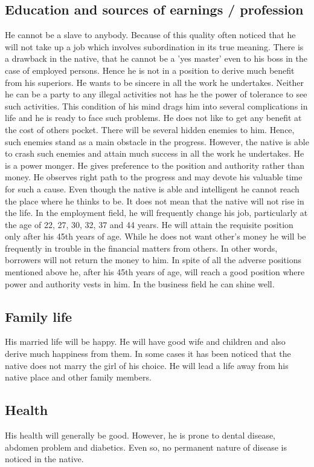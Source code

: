\documentclass[12pt, right open]{memoir}
\begin{document}
\subsection {Education and sources of earnings / profession}
He cannot be a slave to anybody. Because of this quality often noticed that he will not take up a job which involves subordination in its true meaning. There is a drawback in the native, that he cannot be a 'yes master' even to his boss in the case of employed persons. Hence he is not in a position to derive much benefit from his superiors.
He wants to be sincere in all the work he undertakes. Neither he can be a party to any illegal activities not has he the power of tolerance to see such activities. This condition of his mind drags him into several complications in life and he is ready to face such problems. He does not like to get any benefit at the cost of others pocket. There will be several hidden enemies to him. Hence, such enemies stand as a main obstacle in the progress. However, the native is able to crash such enemies and attain much success in all the work he undertakes. He is a power monger. He gives preference to the position and authority rather than money. He observes right path to the progress and may devote his valuable time for such a cause. Even though the native is able and intelligent he cannot reach the place where he thinks to be. It does not mean that the native will not rise in the life.
In the employment field, he will frequently change his job, particularly at the age of 22, 27, 30, 32, 37 and 44 years. He will attain the requisite position only after his 45th years of age. While he does not want other's money he will be frequently in trouble in the financial matters from others. In other words, borrowers will not return the money to him.
In spite of all the adverse positions mentioned above he, after his 45th years of age, will reach a good position where power and authority vests in him. In the business field he can shine well.


\subsection{Family life}
His married life will be happy. He will have good wife and children and also derive much happiness from them. In some cases it has been noticed that the native does not marry the girl of his choice. He will lead a life away from his native place and other family members.

\subsection{Health}
His health will generally be good. However, he is prone to dental disease, abdomen problem and diabetics. Even so, no permanent nature of disease is noticed in the native.
\end{document}

